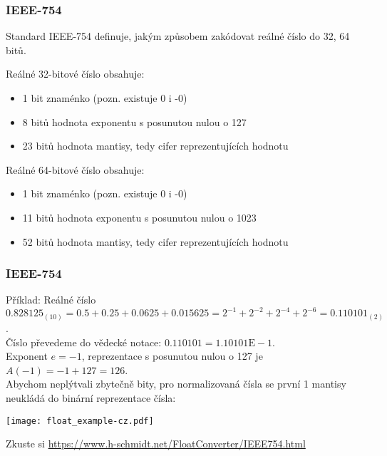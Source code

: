 \documentclass{beamer}
\begin{document}
\begin{frame}
\frametitle{IEEE-754}

Standard IEEE-754 definuje, jakým způsobem zakódovat reálné číslo do 32, 64 bitů.

Reálné 32-bitové číslo obsahuje:
\begin{itemize}
\item 1 bit znaménko (pozn. existuje 0 i -0)
\item 8 bitů hodnota exponentu s posunutou nulou o 127
\item 23 bitů hodnota mantisy, tedy cifer reprezentujících hodnotu
\end{itemize}
\bigskip
Reálné 64-bitové číslo obsahuje:
\begin{itemize}
\item 1 bit znaménko (pozn. existuje 0 i -0)
\item 11 bitů hodnota exponentu s posunutou nulou o 1023
\item 52 bitů hodnota mantisy, tedy cifer reprezentujících hodnotu
\end{itemize}

\end{frame}


\begin{frame}
\frametitle{IEEE-754}

Příklad:
Reálné číslo $0.828125_{(10)} = 0.5+0.25+0.0625+0.015625=2^{-1}+2^{-2}+2^{-4}+2^{-6} = 0.110101_{(2)}$.\\
Číslo převedeme do vědecké notace: $0.110101 = 1.10101\text{E}-1$.\\
Exponent $e=-1$, reprezentace s posunutou nulou o 127 je $A(-1)=-1+127 = 126$.\\
Abychom neplýtvali zbytečně bity, pro normalizovaná čísla se první 1 mantisy neukládá do binární reprezentace čísla:

\begin{center}
\texttt{[image: float\_example-cz.pdf]}
\end{center}

Zkuste si \url{https://www.h-schmidt.net/FloatConverter/IEEE754.html}
\end{frame}
\end{document}
